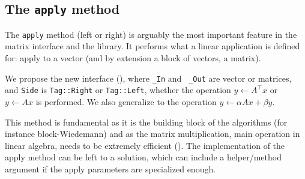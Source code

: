 \subsection{The \texttt{apply} method}\label{ssec:apply}
%
%
\par
%
The \texttt{apply} method (left or right) is arguably the most important
feature in the matrix interface and the \linbox library. It performs what a
linear application is defined for: apply to a vector (and by extension  a block
of vectors, \ie a matrix).
%
\par
%
We propose the new interface (), where {\tt \_In} and {\tt
\_Out} are vector or matrices, and {\tt Side} is {\tt Tag::Right} or
{\tt Tag::Left}, whether the operation $y \gets A^{\top} x$ or  $y \gets A x$ is
performed. We also generalize to the operation $y \gets \alpha A x + \beta y$.
%

%
This method is fundamental as it is the building block of the \applin
algorithms (for instance block-Wiedemann) and as the matrix
multiplication, main operation in linear algebra, needs to be extremely efficient ().
%
%
%
The implementation of the apply method can be left to a \mul solution,
which can include a helper/method argument if the apply
parameters are specialized enough.
%
%
%
